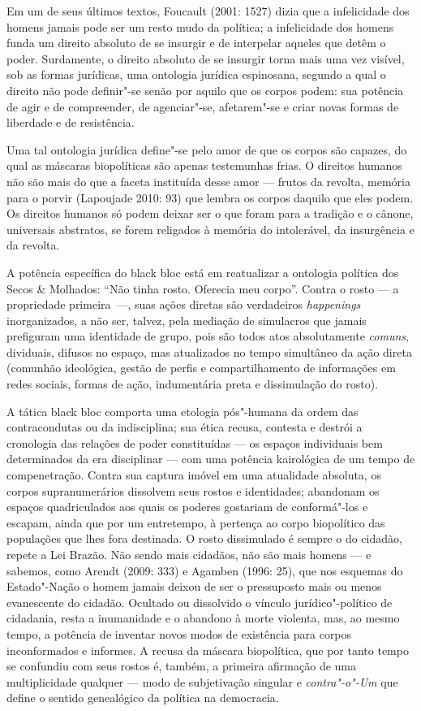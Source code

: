\asterisc

Em um de seus últimos textos, Foucault (2001: 1527) dizia que a
infelicidade dos homens jamais pode ser um resto mudo da política; a
infelicidade dos homens funda um direito absoluto de se insurgir e de
interpelar aqueles que detêm o poder. Surdamente, o direito absoluto de
se insurgir torna mais uma vez visível, sob as formas jurídicas, uma
ontologia jurídica espinosana, segundo a qual o direito não pode
definir"-se senão por aquilo que os corpos podem: sua potência de agir e
de compreender, de agenciar"-se, afetarem"-se e criar novas formas de
liberdade e de resistência.

Uma tal ontologia jurídica define"-se pelo amor de que os corpos são
capazes, do qual as máscaras biopolíticas são apenas testemunhas frias.
O direitos humanos não são mais do que a faceta instituída desse amor ---
frutos da revolta, memória para o porvir (Lapoujade 2010: 93) que
lembra os corpos daquilo que eles podem. Os direitos humanos só podem
deixar ser o que foram para a tradição e o cânone, universais abstratos,
se forem religados à memória do intolerável, da insurgência e da
revolta.

A potência específica do black bloc está em reatualizar a ontologia
política dos Secos \& Molhados: ``Não tinha rosto. Oferecia meu corpo''.
Contra o rosto --- a propriedade primeira~---, suas ações diretas são
verdadeiros \emph{happenings} inorganizados, a não ser, talvez, pela
mediação de simulacros que jamais prefiguram uma identidade de grupo,
pois são todos atos absolutamente \emph{comuns}, dividuais, difusos no
espaço, mas atualizados no tempo simultâneo da ação direta (comunhão
ideológica, gestão de perfis e compartilhamento de informações em redes
sociais, formas de ação, indumentária preta e dissimulação do rosto).

A tática black bloc comporta uma etologia pós"-humana da ordem das
contracondutas ou da indisciplina; sua ética recusa, contesta e destrói
a cronologia das relações de poder constituídas --- os espaços
individuais bem determinados da era disciplinar --- com uma potência
kairológica de um tempo de compenetração. Contra sua captura imóvel em
uma atualidade absoluta, os corpos supranumerários dissolvem seus rostos
e identidades; abandonam os espaços quadriculados aos quais os poderes
gostariam de conformá"-los e escapam, ainda que por um entretempo, à
pertença ao corpo biopolítico das populações que lhes fora destinada. O
rosto dissimulado é sempre o do cidadão, repete a Lei Brazão. Não sendo
mais cidadãos, não são mais homens --- e sabemos, como Arendt (2009:
333) e Agamben (1996: 25), que nos esquemas do Estado"-Nação o homem
jamais deixou de ser o pressuposto mais ou menos evanescente do cidadão.
Ocultado ou dissolvido o vínculo jurídico"-político de cidadania, resta a
inumanidade e o abandono à morte violenta, mas, ao mesmo tempo, a
potência de inventar novos modos de existência para corpos inconformados
e informes. A recusa da máscara biopolítica, que por tanto tempo se
confundiu com seus rostos é, também, a primeira afirmação de uma \enlargethispage{\textheight}
multiplicidade qualquer --- modo de subjetivação singular e
\emph{contra"-o"-Um} que define o sentido genealógico da política na
democracia.


